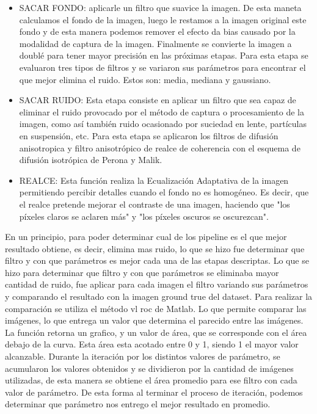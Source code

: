 \begin{itemize}
	\item SACAR  FONDO: aplicarle un filtro que suavice la imagen. De esta maneta calculamos el fondo de la imagen, luego le restamos a la imagen original este fondo y de esta manera podemos remover el efecto da bias causado por la modalidad de captura de la imagen. Finalmente se convierte la imagen a doublé para tener mayor precisión en las próximas etapas. 
Para esta etapa se evaluaron tres tipos de filtros y se variaron sus parámetros para encontrar el que mejor elimina el ruido. Estos son: media, mediana y gaussiano.
	\item SACAR  RUIDO:  Esta etapa consiste en aplicar un filtro que sea capaz de eliminar el ruido provocado por el método de captura o procesamiento de la  imagen, como así también ruido ocasionado por suciedad en lente, partículas en suspensión, etc. 
Para esta etapa se aplicaron los filtros de difusión anisotropica y filtro anisotrópico de realce de coherencia con el esquema de difusión isotrópica de Perona y Malik.
	\item REALCE: Esta función realiza la Ecualización Adaptativa de la imagen permitiendo percibir detalles cuando el fondo no es homogéneo. Es decir, que el realce pretende mejorar el contraste de una imagen, haciendo que "los píxeles claros se aclaren más" y "los píxeles oscuros se oscurezcan". 
\end{itemize}

En un principio, para poder determinar cual de los pipeline es el que mejor resultado obtiene, es decir, elimina mas ruido, lo que se hizo fue determinar que filtro y con que parámetros es mejor cada una de las etapas descriptas.
Lo que se hizo para determinar que filtro y con que parámetros se eliminaba mayor cantidad de ruido, fue aplicar para cada imagen el filtro variando sus parámetros y comparando el resultado con la imagen ground true del dataset. Para realizar la comparación se utiliza el método vl roc de  Matlab. Lo que permite comparar las imágenes, lo que entrega un valor que determina el parecido entre las imágenes. La función retorna un grafico, y un valor de área, que se corresponde con el área debajo de la curva.  Esta área esta acotado entre 0 y 1, siendo 1 el mayor valor alcanzable.
Durante la iteración por los distintos valores de parámetro, se acumularon los valores obtenidos y se dividieron por la cantidad de imágenes utilizadas, de esta manera se obtiene el área promedio para ese filtro con cada valor de parámetro. De esta forma al terminar el proceso de iteración, podemos determinar que parámetro nos entrego el mejor resultado en promedio. 

